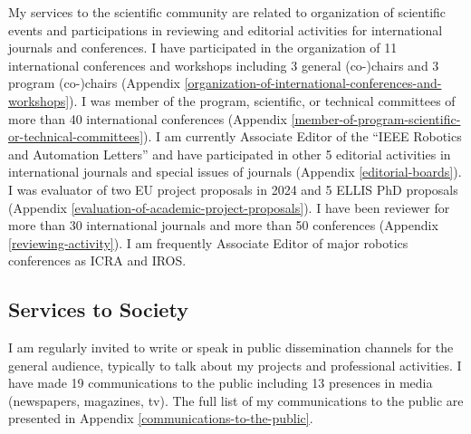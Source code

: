 My services to the scientific community are related to organization of
scientific events and participations in reviewing and editorial
activities for international journals and conferences. I have
participated in the organization of 11 international conferences and
workshops including 3 general (co-)chairs and 3 program (co-)chairs
(Appendix \ref{organization-of-international-conferences-and-workshops}). I was member of the program, scientific, or technical
committees of more than 40 international conferences (Appendix \ref{member-of-program-scientific-or-technical-committees}). I
am currently Associate Editor of the ``IEEE Robotics and Automation
Letters'' and have participated in other 5 editorial activities in
international journals and special issues of journals (Appendix \ref{editorial-boards}).
I was evaluator of two EU project proposals in 2024 and 5 ELLIS PhD
proposals (Appendix \ref{evaluation-of-academic-project-proposals}). I have been reviewer for more than 30
international journals and more than 50 conferences (Appendix \ref{reviewing-activity}). I
am frequently Associate Editor of major robotics conferences as ICRA and
IROS.

\subsection{Services to Society}\label{services-to-society}

I am regularly invited to write or speak in public dissemination
channels for the general audience, typically to talk about my projects
and professional activities. I have made 19 communications to the public
including 13 presences in media (newspapers, magazines, tv). The full
list of my communications to the public are presented in Appendix \ref{communications-to-the-public}.
